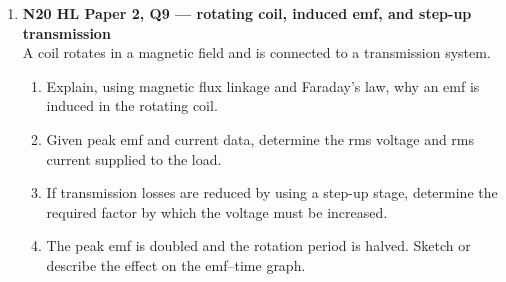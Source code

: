 \documentclass[11pt]{article}
\begin{document}
\begin{enumerate}[leftmargin=*, itemsep=1.2em]
\item \textbf{N20 HL Paper 2, Q9 --- rotating coil, induced emf, and step-up transmission}\\
A coil rotates in a magnetic field and is connected to a transmission system.
\begin{enumerate}[label=(\alph*)]
\item Explain, using magnetic flux linkage and Faraday's law, why an emf is induced in the rotating coil.
\item Given peak emf and current data, determine the rms voltage and rms current supplied to the load.
\item If transmission losses are reduced by using a step-up stage, determine the required factor by which the voltage must be increased.
\item The peak emf is doubled and the rotation period is halved. Sketch or describe the effect on the emf--time graph.
\end{enumerate}

\end{enumerate}
\end{document}
